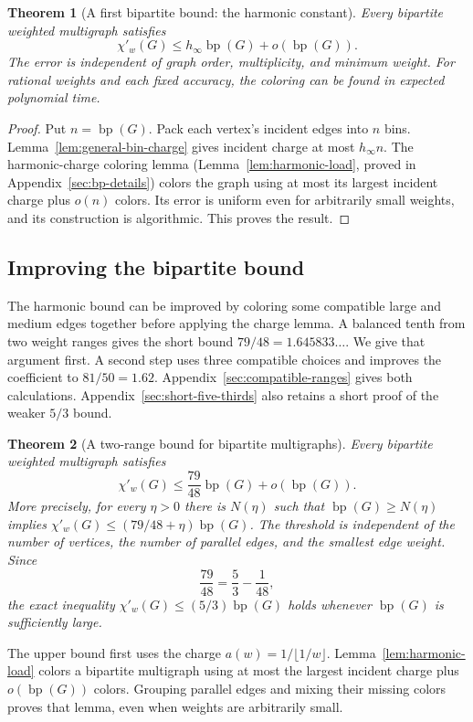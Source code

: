 \documentclass[11pt]{article}
\newtheorem{theorem}{Theorem}[section]
\theoremstyle{definition}\newtheorem{algorithm}{Algorithm}[section]
\numberwithin{equation}{section}
\theoremstyle{remark}\newtheorem*{remark}{Remark}
\newcommand{\bp}{\operatorname{bp}}
\begin{document}
\begin{theorem}[A first bipartite bound: the harmonic constant]
\label{thm:bp-harmonic-first}
Every bipartite weighted multigraph satisfies
\[
 \chi'_w(G)\le h_\infty\bp(G)+o(\bp(G)).
\]
The error is independent of graph order, multiplicity, and minimum
weight. For rational weights and each fixed accuracy, the coloring
can be found in expected polynomial time.
\end{theorem}
\begin{proof}
Put $n=\bp(G)$. Pack each vertex's incident edges into $n$ bins.
Lemma~\ref{lem:general-bin-charge} gives incident charge at most
$h_\infty n$. The harmonic-charge coloring lemma
(Lemma~\ref{lem:harmonic-load}, proved in Appendix~\ref{sec:bp-details})
colors the graph using at most its largest incident charge plus
$o(n)$ colors. Its error is uniform even for arbitrarily small weights,
and its construction is algorithmic. This proves the result.
\end{proof}

\subsection{Improving the bipartite bound}
The harmonic bound can be improved by coloring some compatible large
and medium edges together before applying the charge lemma. A balanced
tenth from two weight ranges gives the short bound
$79/48=1.645833\ldots$.  We give that argument first.  A second step
uses three compatible choices and improves the coefficient to
$81/50=1.62$.  Appendix~\ref{sec:compatible-ranges} gives both
calculations. Appendix~\ref{sec:short-five-thirds} also retains a short
proof of the weaker $5/3$ bound.

\begin{theorem}[A two-range bound for bipartite multigraphs]
\label{thm:bp-two-ranges}
Every bipartite weighted multigraph satisfies
\[
 \chi'_w(G)\le\frac{79}{48}\bp(G)+o(\bp(G)).
\]
More precisely, for every $\eta>0$ there is $N(\eta)$ such that
$\bp(G)\ge N(\eta)$ implies
$\chi'_w(G)\le(79/48+\eta)\bp(G)$.
The threshold is independent of the number of vertices, the number of
parallel edges, and the smallest edge weight. Since
\[
 \frac{79}{48}=\frac53-\frac1{48},
\]
the exact inequality $\chi'_w(G)\le(5/3)\bp(G)$ holds whenever
$\bp(G)$ is sufficiently large.
\end{theorem}
The upper bound first uses the charge
$a(w)=1/\lfloor1/w\rfloor$.
Lemma~\ref{lem:harmonic-load} colors a bipartite multigraph using at
most the largest incident charge plus $o(\bp(G))$ colors.
Grouping parallel edges and mixing their missing colors proves that
lemma, even when weights are arbitrarily small.
\end{document}
